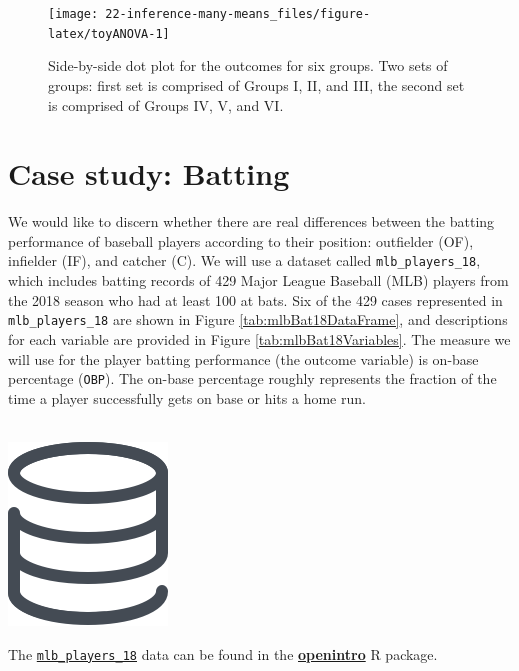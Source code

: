 \documentclass[
  10pt,
  openany]{book}
\newenvironment{mdframedwithfootTipDataPro}
{   
    \savenotes
    \begin{mdframed}[%
    topline=true, bottomline=true, linecolor=oiGray, linewidth=0.5pt,
    rightline=false, leftline=false,
    backgroundcolor=oiLGray]
    \renewcommand{\thempfootnote}{\arabic{footnote}}
    }
{
    \end{mdframed}
    \spewnotes
}
\newenvironment{data}{
\vspace{4mm}
\begin{mdframedwithfootTipDataPro}
\begin{minipage}[t]{0.10\textwidth}
{$\:$ \\ \setkeys{Gin}{width=2em,keepaspectratio}\includegraphics{images/_icons/data.png}}
\end{minipage}
\hfill
\begin{minipage}[t]{0.90\textwidth}
\vspace{-2mm}
\setlength{\parskip}{1em}
}{\end{minipage}
\end{mdframedwithfootTipDataPro}
\vspace{4mm}
}
\begin{document}
\begin{figure}[h]

{\centering \texttt{[image: 22-inference-many-means\_files/figure-latex/toyANOVA-1]} 

}

\caption{Side-by-side dot plot for the outcomes for six groups. Two sets of groups: first set is comprised of Groups I, II, and III, the second set is comprised of Groups IV, V, and VI.}\label{fig:toyANOVA}
\end{figure}

\hypertarget{case-study-batting}{%
\section{Case study: Batting}\label{case-study-batting}}

We would like to discern whether there are real differences between the batting performance of baseball players according to their position: outfielder (OF), infielder (IF), and catcher (C).
We will use a dataset called \texttt{mlb\_players\_18}, which includes batting records of 429 Major League Baseball (MLB) players from the 2018 season who had at least 100 at bats.
Six of the 429 cases represented in \texttt{mlb\_players\_18} are shown in Figure \ref{tab:mlbBat18DataFrame}, and descriptions for each variable are provided in Figure \ref{tab:mlbBat18Variables}.
The measure we will use for the player batting performance (the outcome variable) is on-base percentage (\texttt{OBP}).
The on-base percentage roughly represents the fraction of the time a player successfully gets on base or hits a home run.

\begin{data}
The \href{http://openintrostat.github.io/openintro/reference/mlb_players_18.html}{\texttt{mlb\_players\_18}} data can be found in the \href{http://openintrostat.github.io/openintro}{\textbf{openintro}} R package.

\end{data}
\end{document}

